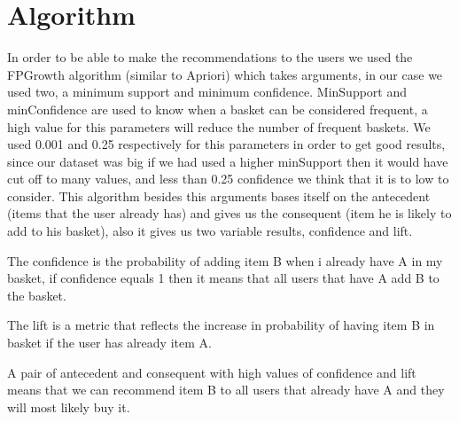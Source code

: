 \section{Algorithm}
\label{algorithm}

In order to be able to make the recommendations to the users we used the FPGrowth algorithm (similar to Apriori) which takes arguments,
in our case we used two, a minimum support and minimum confidence. MinSupport and minConfidence are used to know when a basket 
can be considered frequent, a high value for this parameters will reduce the number of frequent baskets.
We used 0.001 and 0.25 respectively for this parameters in order to get good results, since our dataset was big if we had used
a higher minSupport then it would have cut off to many values, and less than 0.25 confidence we think that it is to low to consider.
This algorithm besides this arguments bases itself on the antecedent (items that the user already has) and gives us
the consequent (item he is likely to add to his basket), also it gives us two variable results, confidence and lift.

The confidence is the probability of adding item B when i already have A in my basket, if confidence equals 1
then it means that all users that have A add B to the basket.

The lift is a metric that reflects the increase in probability of having item B in basket if the user has already
item A.

A pair of antecedent and consequent with high values of confidence and lift means that we can recommend item B to all
users that already have A and they will most likely buy it. 